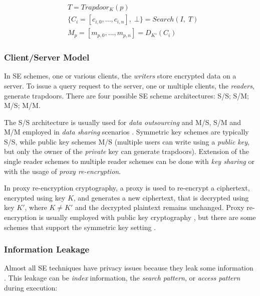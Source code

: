 \begin{equation}
    \begin{split}
    &T = Trapdoor_{K}(p) \\
    &\{ C_i = [c_{i,0}, ..., c_{i,n}], \; \bot\} = Search(I, \; T) \\
    &M_p = [m_{p,0},...,m_{p,n}] = D_{K'}(C_i) 
    \end{split}
\end{equation}

\subsubsection{Client/Server Model}

In \gls{SE} schemes, one or various clients, the \emph{writers} store encrypted data on a server. To issue a query request to the server, one or multiple clients, the  \emph{readers}, generate trapdoors. There are four possible \gls{SE} scheme architectures: \gls{S/S}; \gls{S/M}; \gls{M/S}; \gls{M/M}.

The \gls{S/S} architecture is usually used for \emph{data outsourcing} and \gls{M/S}, \gls{S/M} and \gls{M/M} employed in \emph{data sharing} scenarios \autocite{Bosch2014-eb}. Symmetric key schemes are typically \gls{S/S}, while public key schemes \gls{M/S} (multiple users can write using a \emph{public key}, but only the owner of the \emph{private} key can generate trapdoors).
Extension of the single reader schemes to multiple reader schemes can be done with \emph{key sharing} or with the usage of \emph{proxy re-encryption}. 

In proxy re-encryption cryptography, a proxy is used to re-encrypt a ciphertext, encrypted using key $K$, and generates a new ciphertext, that is decrypted using key $K'$, where $K \neq K'$ and the decrypted plaintext remains unchanged. Proxy re-encryption is usually employed with public key cryptography \autocite{Blaze1998-pz, Ivan2003-uu, Dong2008-qw}, but there are some schemes that support the symmetric key setting \autocite{Syalim2011-fb, Sakurai2017-ui, Peng2017-ia}.

\subsubsection{Information Leakage}

Almost all \gls{SE} techniques have privacy issues because they leak some information \autocite{Bosch2014-eb}. This leakage can be \emph{index} information, the \emph{search pattern}, or \emph{access pattern} during execution:

